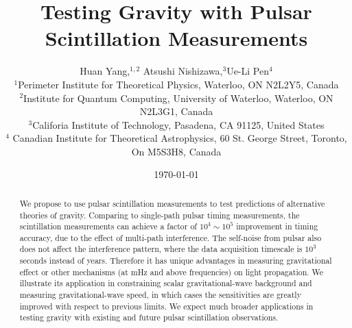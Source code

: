 \documentclass[prl,aps,floatfix,superscriptaddress,twocolumn]{revtex4}
\begin{document}
  



\title{ Testing Gravity with Pulsar Scintillation Measurements} 



\author{Huan Yang,$^{1,2}$ Atsushi Nishizawa,$^{3} $Ue-Li Pen$^{4}$\\
%
$^{1}$Perimeter Institute for Theoretical Physics, Waterloo, ON N2L2Y5, Canada\\
$^{2}$Institute for Quantum Computing, University of Waterloo, Waterloo,
ON N2L3G1, Canada\\
$^{3}$Califoria Institute of Technology, Pasadena, CA 91125, United States \\
$^{4}$ Canadian Institute for Theoretical Astrophysics, 60 St. George Street,
Toronto, On M5S3H8, Canada
}


\date{\today}





\begin{abstract}
We propose to use pulsar scintillation measurements to test predictions of alternative theories of gravity. Comparing to single-path pulsar timing measurements, the scintillation measurements can achieve a factor of $10^4 \sim 10^5 $ improvement in timing accuracy, due to the effect of multi-path interference. The self-noise from pulsar also does not affect the interference pattern, where the data acquisition timescale is $10^3$ seconds instead of years. Therefore it has unique advantages in measuring gravitational effect or other mechanisms (at mHz and above frequencies) on light propagation. We illustrate its application in constraining scalar gravitational-wave background and measuring gravitational-wave speed, in which cases the sensitivities are greatly improved with respect to previous limits. We expect much broader applications in testing gravity with existing and future pulsar scintillation observations. 
\end{abstract}

\maketitle 
\end{document}
